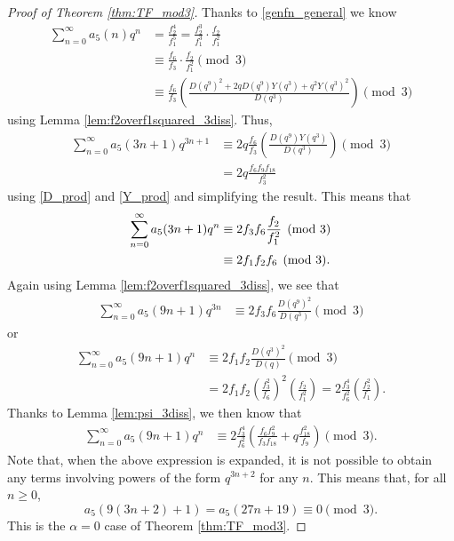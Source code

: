 \documentclass[10pt,a4paper]{amsart}
\theoremstyle{definition}
\theoremstyle{example}
\begin{document}
\setcounter{section}{4}
\setcounter{equation}{0}
\setcounter{theorem}{0}
\begin{proof}[Proof of Theorem  \ref{thm:TF_mod3}]
Thanks to \eqref{genfn_general} we know 
\begin{align*}
\sum_{n=0}^\infty a_5(n)q^n 
&= 
\frac{f_2^4}{f_1^5} = 
\frac{f_2^3}{f_1^3}\cdot \frac{f_2}{f_1^2} \\
&\equiv 
\frac{f_6}{f_3}\cdot \frac{f_2}{f_1^2} \pmod{3}  \\
&\equiv 
\frac{f_6}{f_3}\left( \frac{D(q^9)^2 +2qD(q^9)Y(q^3)+q^2Y(q^3)^2}{D(q^3)}  \right) \pmod{3} 
\end{align*}
using Lemma \ref{lem:f2overf1squared_3diss}.  
Thus, 
\begin{align*}
\sum_{n=0}^\infty a_5(3n+1)q^{3n+1} 
&\equiv 
2q\frac{f_6}{f_3}\left( \frac{D(q^9)Y(q^3)}{D(q^3)}  \right) \pmod{3}  \\
&= 
2q\frac{f_6f_9f_{18}}{f_3^2}
\end{align*}
using \eqref{D_prod} and \eqref{Y_prod} and simplifying the result.  This means that
\begin{align}
\sum_{n=0}^\infty a_5(3n+1)q^{n} 
&\equiv 
2f_3f_{6} \frac{f_2}{f_1^2} \pmod{3} \notag \\
&\equiv
2f_1f_2f_6 \pmod{3}.  \label{3n1_mod3}
\end{align}
Again using Lemma \ref{lem:f2overf1squared_3diss}, we see that 
\begin{align*}
\sum_{n=0}^\infty a_5(9n+1)q^{3n} 
&\equiv 
2f_3f_{6} \frac{D(q^9)^2}{D(q^3)} \pmod{3}
\end{align*}
or 
\begin{align*}
\sum_{n=0}^\infty a_5(9n+1)q^{n} 
&\equiv 
2f_1f_{2}\frac{D(q^3)^2}{D(q)} \pmod{3} \\
&= 
2f_1f_2\left( \frac{f_3^2}{f_6}\right)^2 \left( \frac{f_2}{f_1^2} \right)  = 
2\frac{f_3^4}{f_6^2}\left( \frac{f_2^2}{f_1} \right).
\end{align*}
Thanks to Lemma \ref{lem:psi_3diss}, we then know that 
\begin{align*}
\sum_{n=0}^\infty a_5(9n+1)q^{n} 
&\equiv 
2\frac{f_3^4}{f_6^2}\left( \frac{f_6f_9^2}{f_3f_{18}} +q\frac{f_{18}^2}{f_9} \right) \pmod{3}.
\end{align*}
Note that, when the above expression is expanded, it is not possible to obtain any terms involving powers of the form $q^{3n+2}$ for any $n$.  This means that, for all $n\geq 0$, 
\begin{equation*}
\label{27n19_mod3} 
a_5(9(3n+2)+1) = a_5(27n+19) \equiv 0 \pmod{3}. 
\end{equation*}
This is the $\alpha=0$ case of Theorem \ref{thm:TF_mod3}.  


\end{proof}
\end{document}
